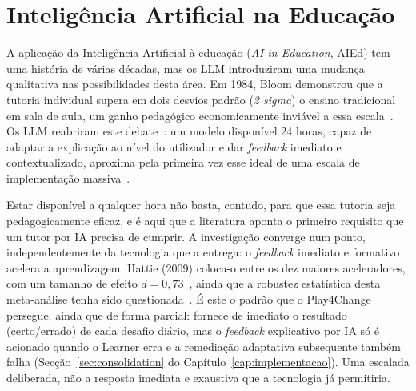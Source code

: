 \section{Inteligência Artificial na Educação} \label{sec:aied}

A aplicação da Inteligência Artificial à educação (\textit{AI in Education}, AIEd) tem uma história de várias décadas, mas os LLM introduziram uma mudança qualitativa nas possibilidades desta área. Em 1984, Bloom demonstrou que a tutoria individual supera em dois desvios padrão (\textit{2 sigma}) o ensino tradicional em sala de aula, um ganho pedagógico economicamente inviável a essa escala~\cite{bloom1984}. Os LLM reabriram este debate~\cite{kasneci2023}: um modelo disponível 24 horas, capaz de adaptar a explicação ao nível do utilizador e dar \textit{feedback} imediato e contextualizado, aproxima pela primeira vez esse ideal de uma escala de implementação massiva~\cite{bommasani2021}.

Estar disponível a qualquer hora não basta, contudo, para que essa tutoria seja pedagogicamente eficaz, e é aqui que a literatura aponta o primeiro requisito que um tutor por IA precisa de cumprir. A investigação converge num ponto, independentemente da tecnologia que a entrega: o \textit{feedback} imediato e formativo acelera a aprendizagem. Hattie (2009) coloca-o entre os dez maiores aceleradores, com um tamanho de efeito $d = 0{,}73$~\cite{hattie2009}, ainda que a robustez estatística desta meta-análise tenha sido questionada~\cite{simpson2017}. É este o padrão que o Play4Change persegue, ainda que de forma parcial: fornece de imediato o resultado (certo/errado) de cada desafio diário, mas o \textit{feedback} explicativo por IA só é acionado quando o Learner erra e a remediação adaptativa subsequente também falha (Secção~\ref{sec:consolidation} do Capítulo~\ref{cap:implementacao}). Uma escalada deliberada, não a resposta imediata e exaustiva que a tecnologia já permitiria.

